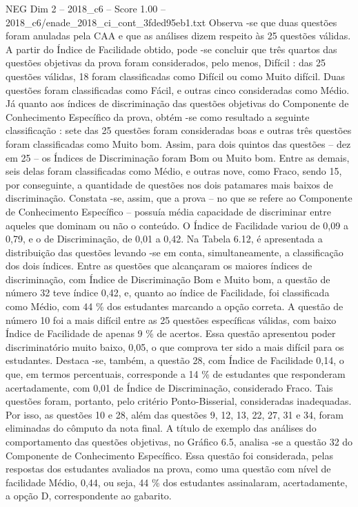 \begin{textsample}{NEG Dim 2 – 2018\_c6 – Score 1.00 – 2018\_c6/enade\_2018\_ci\_cont\_3fded95eb1.txt}
Observa -se que duas questões foram anuladas pela CAA e que as análises dizem respeito às 25 questões válidas.
A partir do Índice de Facilidade obtido, pode -se concluir que três quartos das questões objetivas da prova foram considerados, pelo menos, Difícil : das 25 questões válidas, 18 foram classificadas como Difícil ou como Muito difícil.
Duas questões foram classificadas como Fácil, e outras cinco consideradas como Médio.
Já quanto aos índices de discriminação das questões objetivas do Componente de Conhecimento Específico da prova, obtém -se como resultado a seguinte classificação : sete das 25 questões foram consideradas boas e outras três questões foram classificadas como Muito bom.
Assim, para dois quintos das questões – dez em 25 – os Índices de Discriminação foram Bom ou Muito bom.
Entre as demais, seis delas foram classificadas como Médio, e outras nove, como Fraco, sendo 15, por conseguinte, a quantidade de questões nos dois patamares mais baixos de discriminação.
Constata -se, assim, que a prova – no que se refere ao Componente de Conhecimento Específico – possuía média capacidade de discriminar entre aqueles que dominam ou não o conteúdo.
O Índice de Facilidade variou de 0,09 a 0,79, e o de Discriminação, de 0,01 a 0,42.
Na Tabela 6.12, é apresentada a distribuição das questões levando -se em conta, simultaneamente, a classificação dos dois índices.
Entre as questões que alcançaram os maiores índices de discriminação, com Índice de Discriminação Bom e Muito bom, a questão de número 32 teve índice 0,42, e, quanto ao índice de Facilidade, foi classificada como Médio, com 44 \% dos estudantes marcando a opção correta.
A questão de número 10 foi a mais difícil entre as 25 questões específicas válidas, com baixo Índice de Facilidade de apenas 9 \% de acertos.
Essa questão apresentou poder discriminatório muito baixo, 0,05, o que comprova ter sido a mais difícil para os estudantes.
Destaca -se, também, a questão 28, com Índice de Facilidade 0,14, o que, em termos percentuais, corresponde a 14 \% de estudantes que responderam acertadamente, com 0,01 de Índice de Discriminação, considerado Fraco.
Tais questões foram, portanto, pelo critério Ponto-Bisserial, consideradas inadequadas.
Por isso, as questões 10 e 28, além das questões 9, 12, 13, 22, 27, 31 e 34, foram eliminadas do cômputo da nota final.
A título de exemplo das análises do comportamento das questões objetivas, no Gráfico 6.5, analisa -se a questão 32 do Componente de Conhecimento Específico.
Essa questão foi considerada, pelas respostas dos estudantes avaliados na prova, como uma questão com nível de facilidade Médio, 0,44, ou seja, 44 \% dos estudantes assinalaram, acertadamente, a opção D, correspondente ao gabarito.

\end{textsample}
